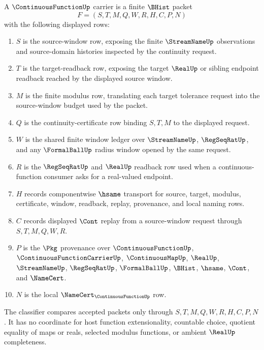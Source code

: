 \begin{definition}
\label{def:continuous-function-carrier}
A $\ContinuousFunctionUp$ carrier is a finite $\BHist$ packet
$$
F=(S,T,M,Q,W,R,H,C,P,N)
$$
with the following displayed rows:
\begin{enumerate}
\item $S$ is the source-window row, exposing the finite $\StreamNameUp$ observations and source-domain histories inspected by the continuity request.
\item $T$ is the target-readback row, exposing the target $\RealUp$ or sibling endpoint readback reached by the displayed source window.
\item $M$ is the finite modulus row, translating each target tolerance request into the source-window budget used by the packet.
\item $Q$ is the continuity-certificate row binding $S,T,M$ to the displayed request.
\item $W$ is the shared finite window ledger over $\StreamNameUp$, $\RegSeqRatUp$, and any $\FormalBallUp$ radius window opened by the same request.
\item $R$ is the $\RegSeqRatUp$ and $\RealUp$ readback row used when a continuous-function consumer asks for a real-valued endpoint.
\item $H$ records componentwise $\hsame$ transport for source, target, modulus, certificate, window, readback, replay, provenance, and local naming rows.
\item $C$ records displayed $\Cont$ replay from a source-window request through $S,T,M,Q,W,R$.
\item $P$ is the $\Pkg$ provenance over $\ContinuousFunctionUp$, $\ContinuousFunctionCarrierUp$, $\ContinuousMapUp$, $\RealUp$, $\StreamNameUp$, $\RegSeqRatUp$, $\FormalBallUp$, $\BHist$, $\hsame$, $\Cont$, and $\NameCert$.
\item $N$ is the local $\NameCert_{\ContinuousFunctionUp}$ row.
\end{enumerate}
The classifier compares accepted packets only through $S,T,M,Q,W,R,H,C,P,N$. It has no coordinate for host function extensionality, countable choice, quotient equality of maps or reals, selected modulus functions, or ambient $\RealUp$ completeness.
\end{definition}

